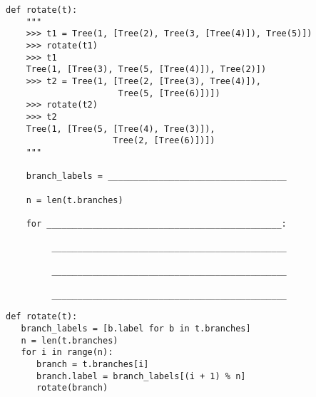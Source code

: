\begin{blocksection}

\begin{lstlisting}
def rotate(t):
    """
    >>> t1 = Tree(1, [Tree(2), Tree(3, [Tree(4)]), Tree(5)])
    >>> rotate(t1)
    >>> t1
    Tree(1, [Tree(3), Tree(5, [Tree(4)]), Tree(2)])
    >>> t2 = Tree(1, [Tree(2, [Tree(3), Tree(4)]), 
                      Tree(5, [Tree(6)])])
    >>> rotate(t2)
    >>> t2
    Tree(1, [Tree(5, [Tree(4), Tree(3)]), 
                     Tree(2, [Tree(6)])])
    """

    branch_labels = ___________________________________

    n = len(t.branches)

    for ______________________________________________:

         ______________________________________________

         ______________________________________________

         ______________________________________________ 
\end{lstlisting}
\end{blocksection}
\begin{blocksection}
\begin{solution}
\begin{lstlisting}
def rotate(t):
   branch_labels = [b.label for b in t.branches]
   n = len(t.branches)
   for i in range(n):
      branch = t.branches[i]
      branch.label = branch_labels[(i + 1) % n]
      rotate(branch)
\end{lstlisting}
\end{solution}
\end{blocksection}